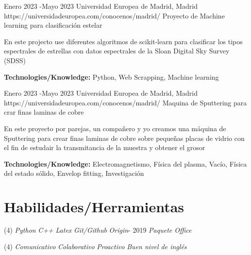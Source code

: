 \documentclass[10pt]{article} %
\begin{document}
\job
{Enero 2023 -}{Mayo 2023}
{Universidad Europea de Madrid, Madrid}
{https://universidadeuropea.com/conocenos/madrid/}
{Proyecto de Machine learning para clasificación estelar}
{En este projecto use diferentes algoritmos de scikit-learn para clasificar los tipos espectrales de estrellas con datos espectrales de la Sloan Digital Sky Survey (SDSS) \\
  \rule{0mm}{5mm}\textbf{Technologies/Knowledge:} Python, Web Scrapping, Machine learning}
\job
{Enero 2023 -}{Mayo 2023}
{Universidad Europea de Madrid, Madrid}
{https://universidadeuropea.com/conocenos/madrid/}
{Maquina de Sputtering para crar finas laminas de cobre}
{En este proyecto por parejas, un compañero y yo creamos una máquina de Sputtering para crear finas laminas de cobre sobre pequeñas placas de vidrio con el fin de estudair la transmitancia de la muestra y obtener el grosor\\
  \rule{0mm}{5mm}\textbf{Technologies/Knowledge:} Electromagnetismo, Física del plasma, Vacío, Física del estado sólido, Envelop fitting, Investigación}





\section{Habilidades/Herramientas}

{
  \begin{tasks}[counter-format={$\cdot$.}, label-align=left, label-offset={0mm}, label-width={5mm}, item-indent={5mm}, label-format={\bfseries}, column-sep=10mm](4)
    \task \textit{Python}
    \task \textit{C++}
    \task \textit{Latex}
    \task \textit{Git/Github}
    \task \textit{Origin}- 2019
    \task \textit{Paquete Office}
    
    \end{tasks}

}
{
  
  \begin{tasks}[counter-format={$\cdot$.}, label-align=left, label-offset={0mm}, label-width={5mm}, item-indent={5mm}, label-format={\bfseries}, column-sep=10mm](4)
    \task \textit{Comunicativo}
    \task \textit{Colaborativo}
    \task \textit{Proactivo}    
    \task \textit{Buen nivel de inglés}    
    
    
    \end{tasks}

}
\end{document}
